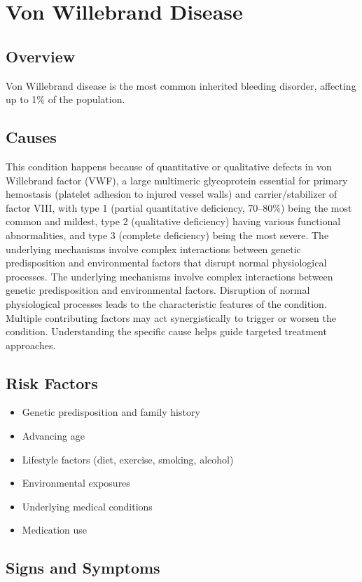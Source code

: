 \chapter{Von Willebrand Disease}
\label{sec:Von Willebrand Disease}

\section{Overview}
Von Willebrand disease is the most common inherited bleeding disorder, affecting up to 1\% of the population.
\section{Causes}
This condition happens because of quantitative or qualitative defects in von Willebrand factor (VWF), a large multimeric glycoprotein essential for primary hemostasis (platelet adhesion to injured vessel walls) and carrier/stabilizer of factor VIII, with type 1 (partial quantitative deficiency, 70--80\%) being the most common and mildest, type 2 (qualitative deficiency) having various functional abnormalities, and type 3 (complete deficiency) being the most severe. The underlying mechanisms involve complex interactions between genetic predisposition and environmental factors that disrupt normal physiological processes. The underlying mechanisms involve complex interactions between genetic predisposition and environmental factors. Disruption of normal physiological processes leads to the characteristic features of the condition. Multiple contributing factors may act synergistically to trigger or worsen the condition. Understanding the specific cause helps guide targeted treatment approaches.
\section{Risk Factors}


\begin{itemize}[noitemsep]
  \item Genetic predisposition and family history
  \item Advancing age
  \item Lifestyle factors (diet, exercise, smoking, alcohol)
  \item Environmental exposures
  \item Underlying medical conditions
  \item Medication use
\end{itemize}
\section{Signs and Symptoms}

